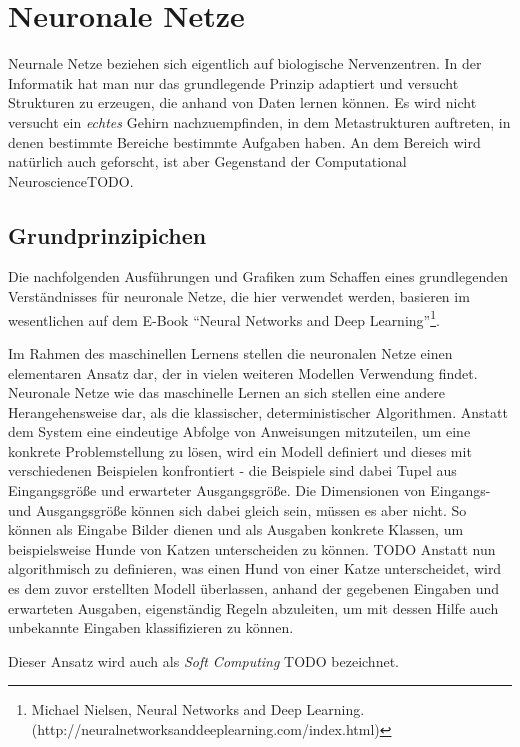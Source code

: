 \section{Neuronale Netze}

Neurnale Netze beziehen sich eigentlich auf biologische Nervenzentren. In der Informatik hat man nur das grundlegende Prinzip adaptiert und versucht Strukturen zu erzeugen, die anhand von Daten lernen können. Es wird nicht versucht ein \textit{echtes} Gehirn nachzuempfinden, in dem Metastrukturen auftreten, in denen bestimmte Bereiche bestimmte Aufgaben haben. An dem Bereich wird natürlich auch geforscht, ist aber Gegenstand der Computational NeuroscienceTODO.

\subsection{Grundprinzipichen}

Die nachfolgenden Ausführungen und Grafiken zum Schaffen eines grundlegenden Verständnisses für neuronale Netze, die hier verwendet werden, basieren im wesentlichen auf dem E-Book ``Neural Networks and Deep Learning''\footnote{Michael Nielsen, Neural Networks and Deep Learning.\newline(http://neuralnetworksanddeeplearning.com/index.html)}.

Im Rahmen des maschinellen Lernens stellen die neuronalen Netze einen elementaren Ansatz dar, der in vielen weiteren Modellen Verwendung findet. Neuronale Netze wie das maschinelle Lernen an sich stellen eine andere Herangehensweise dar, als die klassischer, deterministischer Algorithmen. Anstatt dem System eine eindeutige Abfolge von Anweisungen mitzuteilen, um eine konkrete Problemstellung zu lösen, wird ein Modell definiert und dieses mit verschiedenen Beispielen konfrontiert - die Beispiele sind dabei Tupel aus Eingangsgröße und erwarteter Ausgangsgröße. Die Dimensionen von Eingangs- und Ausgangsgröße können sich dabei gleich sein, müssen es aber nicht. So können als Eingabe Bilder dienen und als Ausgaben konkrete Klassen, um beispielsweise Hunde von Katzen unterscheiden zu können. TODO
Anstatt nun algorithmisch zu definieren, was einen Hund von einer Katze unterscheidet, wird es dem zuvor erstellten Modell überlassen, anhand der gegebenen Eingaben und erwarteten Ausgaben, eigenständig Regeln abzuleiten, um mit dessen Hilfe auch unbekannte Eingaben klassifizieren zu können.

Dieser Ansatz wird auch als \textit{Soft Computing} TODO bezeichnet.

